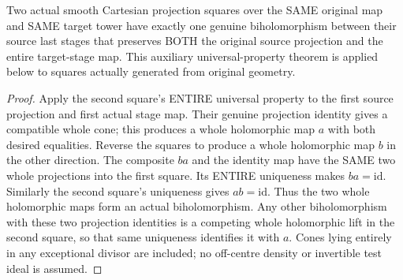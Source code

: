\begin{theorem}
\label{hir:submersion-cartesian-choice-whole-comparison}
\leanok
{}
Two actual smooth Cartesian projection squares over the SAME original map
and SAME target tower have exactly one genuine biholomorphism between their
source last stages that preserves BOTH the original source projection and
the entire target-stage map. This auxiliary universal-property theorem is
applied below to squares actually generated from original geometry.
\end{theorem}
\begin{proof}
Apply the second square's ENTIRE universal property to the first source
projection and first actual stage map. Their genuine projection identity
gives a compatible whole cone; this produces a whole holomorphic map $a$
with both desired equalities. Reverse the squares to produce a whole
holomorphic map $b$ in the other direction. The composite $ba$ and the
identity map have the SAME two whole projections into the first square.
Its ENTIRE uniqueness makes $ba=\mathrm{id}$. Similarly the second square's
uniqueness gives $ab=\mathrm{id}$. Thus the two whole holomorphic maps form
an actual biholomorphism. Any other biholomorphism with these two projection
identities is a competing whole holomorphic lift in the second square, so
that same uniqueness identifies it with $a$. Cones lying entirely in any
exceptional divisor are included; no off-centre density or invertible test
ideal is assumed.
\end{proof}

